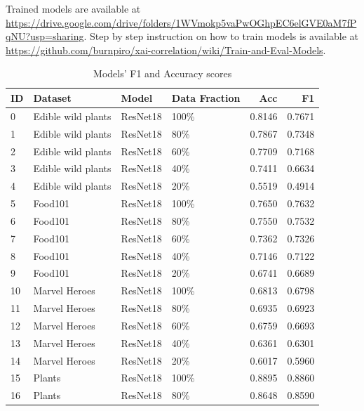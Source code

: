 Trained models are available at \url{https://drive.google.com/drive/folders/1WVmokp5vaPwOGhpEC6elGVE0aM7fPqNU?usp=sharing}. Step by step instruction on how to train models is available at \url{https://github.com/burnpiro/xai-correlation/wiki/Train-and-Eval-Models}.

\begin{longtable}{|l|l|l|l|r|r|}
\caption{Models' F1 and Accuracy scores}
\label{tab:appendix:models:all-scores} \\\hline
ID &        Dataset &         Model & Data Fraction &     Acc &      F1 \\\hline
0  &  Edible wild plants &      ResNet18 &       100\% &  0.8146 &  0.7671 \\
1  &  Edible wild plants &      ResNet18 &        80\% &  0.7867 &  0.7348 \\
2  &  Edible wild plants &      ResNet18 &        60\% &  0.7709 &  0.7168 \\
3  &  Edible wild plants &      ResNet18 &        40\% &  0.7411 &  0.6634 \\
4  &  Edible wild plants &      ResNet18 &        20\% &  0.5519 &  0.4914 \\\hline
5  &        Food101 &      ResNet18 &       100\% &  0.7650 &  0.7632 \\
6  &        Food101 &      ResNet18 &        80\% &  0.7550 &  0.7532 \\
7  &        Food101 &      ResNet18 &        60\% &  0.7362 &  0.7326 \\
8  &        Food101 &      ResNet18 &        40\% &  0.7146 &  0.7122 \\
9  &        Food101 &      ResNet18 &        20\% &  0.6741 &  0.6689 \\\hline
10 &         Marvel Heroes &      ResNet18 &       100\% &  0.6813 &  0.6798 \\
11 &         Marvel Heroes &      ResNet18 &        80\% &  0.6935 &  0.6923 \\
12 &         Marvel Heroes &      ResNet18 &        60\% &  0.6759 &  0.6693 \\
13 &         Marvel Heroes &      ResNet18 &        40\% &  0.6361 &  0.6301 \\
14 &         Marvel Heroes &      ResNet18 &        20\% &  0.6017 &  0.5960 \\\hline
15 &     Plants &      ResNet18 &       100\% &  0.8895 &  0.8860 \\
16 &     Plants &      ResNet18 &        80\% &  0.8648 &  0.8590 \\

\end{longtable}
